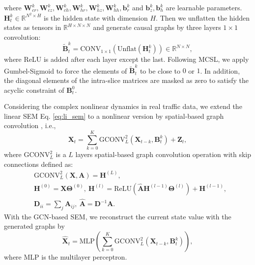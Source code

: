 \documentclass[letterpaper, 10 pt, conference]{ieeeconf}
\newcommand{\revise}[1]{{\color{black}{#1}}}
\begin{document}
where $\mathbf{W}_{cr}^{k},\mathbf{W}_{cz}^{k},\mathbf{W}_{ch}^{k},\mathbf{W}_{hr}^{k},\mathbf{W}_{hz}^{k},\mathbf{W}_{hh}^{k},\mathbf{b}_r^k$ and $\mathbf{b}_z^k,\mathbf{b}_h^k$ are learnable parameters. \revise{$\odot$ represents element-wise product between two matrices or tensors.} $\mathbf{H}_t^k\in\mathbb{R}^{N^2\times H}$ is the hidden state with dimension $H$. Then we unflatten the hidden states as tensors in $\mathbb{R}^{H\times N\times N}$ and generate causal graphs by three layers $1\times1$ convolution:
\begin{equation}
        \tilde{\mathbf{B}}_t^k=\text{CONV}_{1\times1}(\text{Unflat}(\mathbf{H}_t^k))\in\mathbb{R}^{N\times N},
\end{equation}
where ReLU is added after each layer except the last. Following MCSL, we apply Gumbel-Sigmoid to force the elements of $\tilde{\mathbf{B}}_t^k$ to be close to $0$ or $1$.
In addition, the diagonal elements of the intra-slice matrices are masked as zero to satisfy the acyclic constraint of $\mathbf{B}_t^0$.


Considering the complex nonlinear dynamics in real traffic data, we extend the linear SEM Eq. \eqref{eq:li_sem} to a nonlinear version by spatial-based graph convolution \cite{hamilton2017inductive}, i.e.,
\begin{equation}
        \label{eq:gcn_sem}
        \mathbf{X}_t=\sum_{k=0}^K\text{GCONV}^2_L(\mathbf{X}_{t-k}, \mathbf{B}^k_t)+\mathbf{Z}_t,
\end{equation}
where $\text{GCONV}^2_L$ is a $L$ layers spatial-based graph convolution operation with skip connections defined as:
\begin{equation}
        \label{eq:def_spa_gconv}
        \begin{aligned}
                &\text{GCONV}^2_L(\mathbf{X},\mathbf{A})=\mathbf{H}^{(L)},\\
                &\mathbf{H}^{(0)}=\mathbf{X}\mathbf{\Theta}^{(0)},\ \mathbf{H}^{(l)}=\text{ReLU}(\hat{\mathbf{A}}\mathbf{H}^{(l-1)}\mathbf{\Theta}^{(l)})+\mathbf{H}^{(l-1)},\\
                &\mathbf{D}_{ii}=\sum_j\mathbf{A}_{ij},\ \hat{\mathbf{A}}=\mathbf{D}^{-1}\mathbf{A}.
        \end{aligned}
\end{equation}
With the GCN-based SEM, we reconstruct the current state value with the generated graphs by
\begin{equation}
        \hat{\mathbf{X}}_t=\text{MLP}\left(\sum_{k=0}^K\text{GCONV}^2_L(\mathbf{X}_{t-k}, \mathbf{B}_t^k)\right),
\end{equation}
where MLP is the multilayer perceptron.
\end{document}
